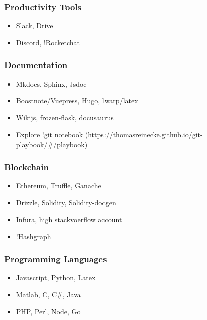 \subsubsection{Productivity Tools}\label{productivity-tools}

\begin{itemize}
\tightlist
\item
  Slack, Drive
\item
  Discord, !Rocketchat
\end{itemize}


\subsubsection{Documentation}\label{documentation}

\begin{itemize}
\tightlist
\item
  Mkdocs, Sphinx, Jsdoc
\item
  Boostnote/Vuepress, Hugo, lwarp/latex
\item
  Wikijs, frozen-flask, docusaurus
\item
  Explore !git notebook
  (\url{https://thomasreinecke.github.io/git-playbook/\#/playbook})
\end{itemize}


\subsubsection{Blockchain}\label{blockchain}

\begin{itemize}
\tightlist
\item
  Ethereum, Truffle, Ganache
\item
  Drizzle, Solidity, Solidity-docgen
\item
  Infura, high stackvoerflow account
\item
  !Hashgraph
\end{itemize}


\subsubsection{Programming Languages}\label{programming-languages}

\begin{itemize}
\tightlist
\item
  Javascript, Python, Latex
\item
  Matlab, C, C\#, Java
\item
  PHP, Perl, Node, Go
\end{itemize}

